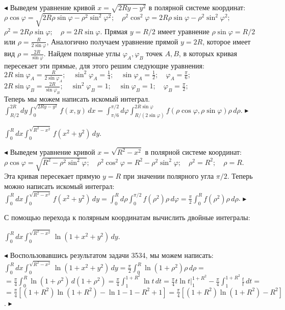 \documentclass[a5paper,10pt]{article}
\begin{document}
\smallskip
\noindent $\blacktriangleleft$ Выведем уравнение кривой $x=\sqrt{2Ry-y^2}$ в полярной системе
координат:\\
$\rho\cos\varphi=\sqrt{2R\rho\sin\varphi-\rho^2\sin^2\varphi^2};
\quad\rho^2\cos^2\varphi=2R\rho\sin\varphi-\rho^2\sin^2\varphi^2;$\\
$\rho^2=2R\rho\sin\varphi;\quad\rho=2R\sin\varphi.$
Прямая $y=R/2$ имеет уравнение $\rho\sin\varphi=R/2$ или $\displaystyle\rho=\frac{R}{2\sin\varphi}$,
Аналогично получаем уравнение прямой $y=2R$, которое имеет вид $\displaystyle\rho=\frac{2R}{\sin\varphi}.$ Найдем полярные углы $\varphi_A,\varphi_B$ точек $A,B$, в которых кривая пересекает эти прямые,
для этого решим следующие уравнения:\\
$\displaystyle2R\sin\varphi_A=\frac{R}{2\sin\varphi_A};\quad\sin^2\varphi_A=\frac{1}{4};
\quad\sin\varphi_A=\frac{1}{2};\quad\varphi_A=\frac{\pi}{6};$\\
$\displaystyle2R\sin\varphi_B=\frac{2R}{\sin\varphi_B};\quad\sin^2\varphi_B=1;
\quad\sin\varphi_B=1;\quad\varphi_B=\frac{\pi}{2};$\\
Теперь мы можем написать искомый интеграл.\\
$\displaystyle \int_{R/2}^{2R}dy\int_0^{\sqrt{2Ry-y^2}}f(x,y)\,dx=
\int_{\pi/6}^{\pi/2}d\varphi\int_{R/(2\sin\varphi)}^{2R\sin\varphi}f(\rho\cos\varphi,\rho\sin\varphi)\rho\,d\rho$.
$\blacktriangleright$ 

\medskip
{} $\displaystyle \int_0^Rdx\int_0^{\sqrt{R^2-x^2}}f(x^2+y^2)\,dy$.

\smallskip
\noindent $\blacktriangleleft$ Выведем уравнение кривой $x=\sqrt{R^2-x^2}$ в полярной системе
координат:\\
$\rho\cos\varphi=\sqrt{R^2-\rho^2\sin^2\varphi};
\quad\rho^2\cos^2\varphi=R^2-\rho^2\sin^2\varphi;\quad\rho^2=R^2;\quad\rho=R.$\\
Эта кривая пересекает прямую $y=R$ при значении полярного угла $\pi/2$. Теперь можно
написать искомый интеграл:\\
$\displaystyle \int_0^Rdx\int_0^{\sqrt{R^2-x^2}}f(x^2+y^2)\,dy=
\int_{0}^{R}d\rho\int_{0}^{\pi/2}f(\rho^2)\rho\,d\varphi=\frac{\pi}{2}\int_{0}^{R}f(\rho^2)\rho\,d\rho$.
 $\blacktriangleright$ 

\medskip
\noindent С помощью перехода к полярным координатам вычислить двойные интегралы:

\medskip
{} $\displaystyle \int_0^Rdx\int_0^{\sqrt{R^2-x^2}}\ln(1+x^2+y^2)\,dy$.

\smallskip
\noindent $\blacktriangleleft$ Воспользовавшись результатом задачи 3534, мы можем написать:\\
$\displaystyle \int_0^Rdx\int_0^{\sqrt{R^2-x^2}}\ln(1+x^2+y^2)\,dy=
\frac{\pi}{2}\int_{0}^{R}\ln(1+\rho^2)\rho\,d\rho=$\\
$\displaystyle =\frac{\pi}{4}\int_{0}^{R}\ln(1+\rho^2)\,d(1+\rho^2)=
\frac{\pi}{4}\int_{1}^{1+R^2}\ln t\,dt=
\frac{\pi}{4}t\ln t\Big|_{1}^{1+R^2}-\frac{\pi}{4}\int_{1}^{1+R^2}\frac tt\,dt=$\\
$\displaystyle =\frac{\pi}{4}[(1+R^2)\ln(1+R^2)-\ln1-1-R^2+1]=\frac{\pi}{4}[(1+R^2)\ln(1+R^2)-R^2]$.
$\blacktriangleright$ 
\end{document}
